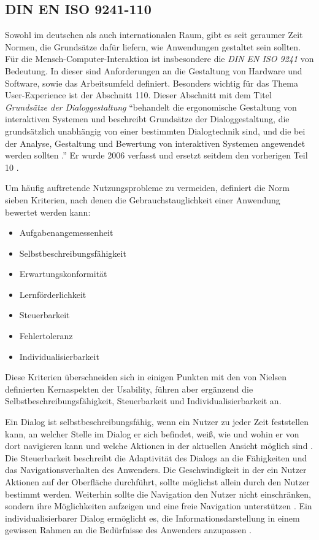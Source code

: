 \subsection{DIN EN ISO 9241-110} \label{sec:uidNorms}
Sowohl im deutschen als auch internationalen Raum, gibt es seit geraumer Zeit Normen, die Grundsätze dafür liefern, wie Anwendungen gestaltet sein sollten. Für die Mensch-Computer-Interaktion ist insbesondere die \textit{DIN EN ISO 9241} von Bedeutung. In dieser sind Anforderungen an die Gestaltung von Hardware und Software, sowie das Arbeitsumfeld definiert. Besonders wichtig für das Thema User-Experience ist der Abschnitt 110. Dieser Abschnitt mit dem Titel \textit{Grundsätze der Dialoggestaltung} \enquote{behandelt die ergonomische Gestaltung von interaktiven Systemen und beschreibt Grundsätze der Dialoggestaltung, die grundsätzlich unabhängig von einer bestimmten Dialogtechnik sind, und die bei der Analyse, Gestaltung und Bewertung von interaktiven Systemen angewendet werden sollten \cite[S. 4]{DIN2006}.} Er wurde 2006 verfasst und ersetzt seitdem den vorherigen Teil 10 \cite{DIN2006}.\par
Um häufig auftretende Nutzungsprobleme zu vermeiden, definiert die Norm sieben Kriterien, nach denen die Gebrauchstauglichkeit einer Anwendung bewertet werden kann:
\begin{itemize}
	\item Aufgabenangemessenheit
	\item Selbstbeschreibungsfähigkeit
	\item Erwartungskonformität
	\item Lernförderlichkeit
	\item Steuerbarkeit
	\item Fehlertoleranz
	\item Individualisierbarkeit \cite[S. 7]{DIN2006}
\end{itemize}
Diese Kriterien überschneiden sich in einigen Punkten mit den von Nielsen definierten Kernaspekten der Usability, führen aber ergänzend die Selbstbeschreibungsfähigkeit, Steuerbarkeit und Individualisierbarkeit an.\par
Ein Dialog ist selbstbeschreibungsfähig, wenn ein Nutzer zu jeder Zeit feststellen kann, an welcher Stelle im Dialog er sich befindet, weiß, wie und wohin er von dort navigieren kann und welche Aktionen in der aktuellen Ansicht möglich sind \cite[S. 10]{DIN2006}. Die Steuerbarkeit beschreibt die Adaptivität des Dialogs an die Fähigkeiten und das Navigationsverhalten des Anwenders. Die Geschwindigkeit in der ein Nutzer Aktionen auf der Oberfläche durchführt, sollte möglichst allein durch den Nutzer bestimmt werden. Weiterhin sollte die Navigation den Nutzer nicht einschränken, sondern ihre Möglichkeiten aufzeigen und eine freie Navigation unterstützen \cite[S. 13]{DIN2006}. Ein individualisierbarer Dialog ermöglicht es, die Informationsdarstellung in einem gewissen Rahmen an die Bedürfnisse des Anwenders anzupassen \cite[S. 15]{DIN2006}. \par
